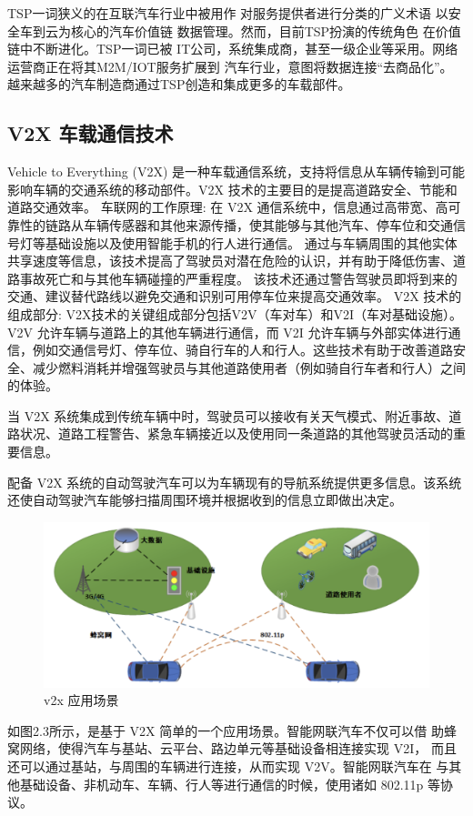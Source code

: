 TSP一词狭义的在互联汽车行业中被用作
对服务提供者进行分类的广义术语
以安全车到云为核心的汽车价值链
数据管理。然而，目前TSP扮演的传统角色
在价值链中不断进化。TSP一词已被
IT公司，系统集成商，甚至一级企业等采用。网络
运营商正在将其M2M/IOT服务扩展到
汽车行业，意图将数据连接“去商品化”。
越来越多的汽车制造商通过TSP创造和集成更多的车载部件。

\subsection{V2X 车载通信技术}

Vehicle to Everything (V2X) 是一种车载通信系统，支持将信息从车辆传输到可能影响车辆的交通系统的移动部件。V2X 技术的主要目的是提高道路安全、节能和道路交通效率。
\newline
车联网的工作原理: 在 V2X 通信系统中，信息通过高带宽、高可靠性的链路从车辆传感器和其他来源传播，使其能够与其他汽车、停车位和交通信号灯等基础设施以及使用智能手机的行人进行通信。
通过与车辆周围的其他实体共享速度等信息，该技术提高了驾驶员对潜在危险的认识，并有助于降低伤害、道路事故死亡和与其他车辆碰撞的严重程度。
该技术还通过警告驾驶员即将到来的交通、建议替代路线以避免交通和识别可用停车位来提高交通效率。
\newline
V2X 技术的组成部分:
V2X技术的关键组成部分包括V2V（车对车）和V2I（车对基础设施）。V2V 允许车辆与道路上的其他车辆进行通信，而 V2I 允许车辆与外部实体进行通信，例如交通信号灯、停车位、骑自行车的人和行人。这些技术有助于改善道路安全、减少燃料消耗并增强驾驶员与其他道路使用者（例如骑自行车者和行人）之间的体验。

当 V2X 系统集成到传统车辆中时，驾驶员可以接收有关天气模式、附近事故、道路状况、道路工程警告、紧急车辆接近以及使用同一条道路的其他驾驶员活动的重要信息。

配备 V2X 系统的自动驾驶汽车可以为车辆现有的导航系统提供更多信息。该系统还使自动驾驶汽车能够扫描周围环境并根据收到的信息立即做出决定。
\begin{figure}
    \centering
    \includegraphics[scale=0.6]{resources/img/i3.png}
    \caption{v2x 应用场景}
  \end{figure}
\newline
如图2.3所示，是基于 V2X 简单的一个应用场景。智能网联汽车不仅可以借
助蜂窝网络，使得汽车与基站、云平台、路边单元等基础设备相连接实现 V2I，
而且还可以通过基站，与周围的车辆进行连接，从而实现 V2V。智能网联汽车在
与其他基础设备、非机动车、车辆、行人等进行通信的时候，使用诸如 802.11p
等协议。

